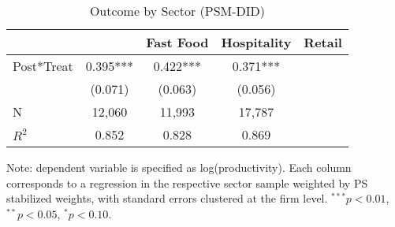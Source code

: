 \begin{table}[!htbp]\centering
\caption{Outcome by Sector (PSM-DID)}
\label{tab:psm_did_by_sector}
\begin{threeparttable}
\begin{tabular}{l*{3}{c}}
\toprule
 &  & Fast Food & Hospitality & Retail \\
\midrule
Post*Treat & 0.395*** & 0.422*** & 0.371*** \\
           & (0.071) & (0.063) & (0.056) \\
\midrule
N          & 12,060 & 11,993 & 17,787 \\
$R^2$      & 0.852 & 0.828 & 0.869 \\
\bottomrule
\end{tabular}
\begin{tablenotes}[flushleft]
\footnotesize
Note: dependent variable is specified as log(productivity). Each column corresponds to a regression in the respective sector sample weighted by PS stabilized weights, with standard errors clustered at the firm level. $^{***}p<0.01$, $^{**}p<0.05$, $^{*}p<0.10$.
\end{tablenotes}
\end{threeparttable}
\end{table}